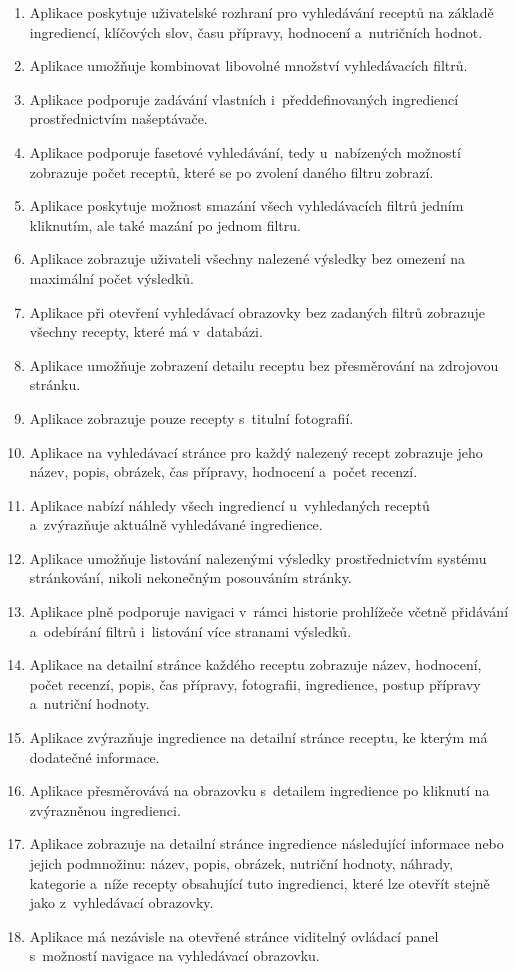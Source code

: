 \begin{enumerate}
    \item Aplikace poskytuje uživatelské rozhraní pro vyhledávání receptů na základě ingrediencí, klíčových slov, času přípravy, hodnocení a~nutričních hodnot.
    \item Aplikace umožňuje kombinovat libovolné množství vyhledávacích filtrů.
    \item Aplikace podporuje zadávání vlastních i~předdefinovaných ingrediencí prostřednictvím našeptávače.
    \item Aplikace podporuje fasetové vyhledávání, tedy u~nabízených možností zobrazuje počet receptů, které se po zvolení daného filtru zobrazí.
    \item Aplikace poskytuje možnost smazání všech vyhledávacích filtrů jedním kliknutím, ale také mazání po jednom filtru.
    \item Aplikace zobrazuje uživateli všechny nalezené výsledky bez omezení na maximální počet výsledků.
    \item Aplikace při otevření vyhledávací obrazovky bez zadaných filtrů zobrazuje všechny recepty, které má v~databázi.
    \item Aplikace umožňuje zobrazení detailu receptu bez přesměrování na zdrojovou stránku.
    \item Aplikace zobrazuje pouze recepty s~titulní fotografií.
    \item Aplikace na vyhledávací stránce pro každý nalezený recept zobrazuje jeho název, popis, obrázek, čas přípravy, hodnocení a~počet recenzí.
    \item Aplikace nabízí náhledy všech ingrediencí u~vyhledaných receptů a~zvýrazňuje aktuálně vyhledávané ingredience.
    \item Aplikace umožňuje listování nalezenými výsledky prostřednictvím systému stránkování, nikoli nekonečným posouváním stránky.
    \item Aplikace plně podporuje navigaci v~rámci historie prohlížeče včetně přidávání a~odebírání filtrů i~listování více stranami výsledků.
    \item Aplikace na detailní stránce každého receptu zobrazuje název, hodnocení, počet recenzí, popis, čas přípravy, fotografii, ingredience, postup přípravy a~nutriční hodnoty.
    \item Aplikace zvýrazňuje ingredience na detailní stránce receptu, ke kterým má dodatečné informace.
    \item Aplikace přesměrovává na obrazovku s~detailem ingredience po kliknutí na zvýrazněnou ingredienci.
    \item Aplikace zobrazuje na detailní stránce ingredience následující informace nebo jejich podmnožinu: název, popis, obrázek, nutriční hodnoty, náhrady, kategorie a~níže recepty obsahující tuto ingredienci, které lze otevřít stejně jako z~vyhledávací obrazovky.
    \item Aplikace má nezávisle na otevřené stránce viditelný ovládací panel s~možností navigace na vyhledávací obrazovku.
\end{enumerate}

